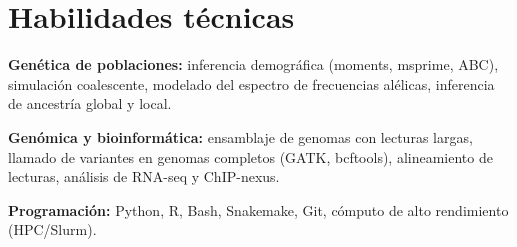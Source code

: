\documentclass[11pt,letterpaper]{article}
\begin{document}
\section*{Habilidades técnicas}
\textbf{Genética de poblaciones:} inferencia demográfica (moments, msprime, ABC), simulación coalescente, modelado del espectro de frecuencias alélicas, inferencia de ancestría global y local.\par
\textbf{Genómica y bioinformática:} ensamblaje de genomas con lecturas largas, llamado de variantes en genomas completos (GATK, bcftools), alineamiento de lecturas, análisis de RNA-seq y ChIP-nexus.\par
\textbf{Programación:} Python, R, Bash, Snakemake, Git, cómputo de alto rendimiento (HPC/Slurm).
\end{document}
